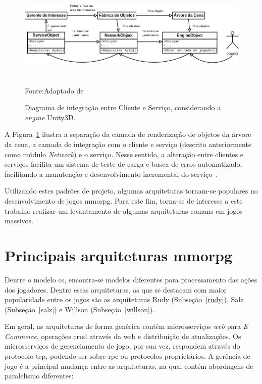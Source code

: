 \begin{figure}[htb!]
\caption{Diagrama de integração entre Cliente e Serviço, considerando a \textit{engine} Unity3D.}
\label{fig:integracao_unity_albion}
\includegraphics[height=4.5cm]{img/cap2/integracao_unity_albion.png}
\centering

Fonte:Adaptado de ~\cite{albion_online_unite}
\end{figure}

A Figura~\ref{fig:integracao_unity_albion} ilustra a separação da camada de renderização de objetos da árvore da cena, a camada de integração com o cliente e serviço (descrito anteriormente como módulo \textit{Network}) e o serviço.
%
Nesse sentido, a alteração entre clientes e serviços facilita um sistema de teste de carga e busca de erros automatizado, facilitando a manutenção e desenvolvimento incremental do serviço~\cite{albion_online_unite}.

Utilizando estes padrões de projeto, algumas arquiteturas tornam-se populares no desenvolvimento de jogos \ac{mmorpg}.
%
Para este fim, torna-se de interesse a este trabalho realizar um levantamento de algumas arquiteturas comuns em jogos massivos.

\section{Principais arquiteturas \ac{mmorpg}}

Dentre o modelo \ac{cs}, encontra-se modelos diferentes para processamento das ações dos jogadores.
%
Dentre essas arquiteturas, as que se destacam com maior popularidade entre os jogos são as arquiteturas Rudy (Subseção~\ref{rudy}), Salz (Subseção~\ref{salz}) e Willson (Subseção~\ref{willson}).

Em geral, as arquiteturas de forma genérica contém microsserviços \textit{web} para \textit{E Commerce}, operações \ac{crud} através da web e distribuição de atualizações.
%
Os microsserviços de gerenciamento de jogo, por sua vez, respondem através do protocolo \ac{tcp}, podendo ser sobre \ac{rpc} ou protocolos proprietários.
%
A gerência de jogo é a principal mudança entre as arquiteturas, na qual contém abordagens de paralelismo diferentes:

